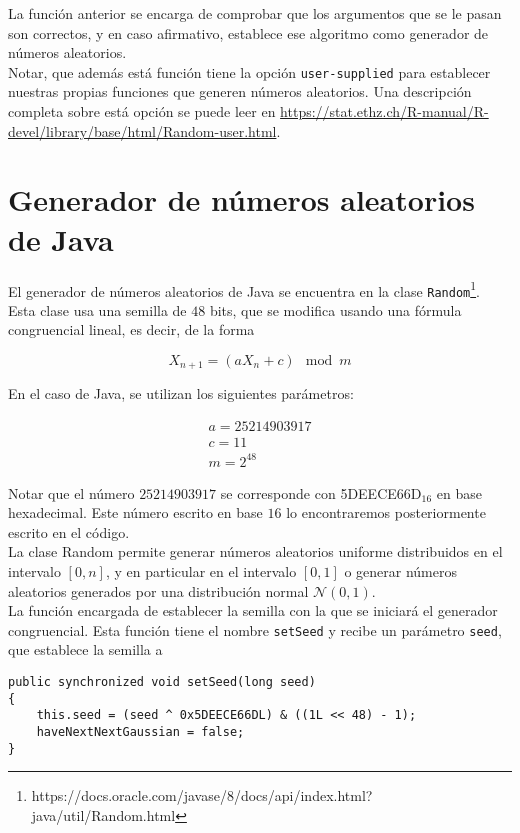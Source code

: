 \documentclass[12pt,a4paper,twoside,openright,titlepage,final]{article}
\begin{document}
La función anterior se encarga de comprobar que los argumentos que se le pasan son correctos, y en caso afirmativo, establece ese algoritmo como generador de números aleatorios.\\

Notar, que además está función tiene la opción \texttt{user-supplied} para establecer nuestras propias funciones que generen números aleatorios. Una descripción completa sobre está opción se puede leer en \url{https://stat.ethz.ch/R-manual/R-devel/library/base/html/Random-user.html}.\\


\section{Generador de números aleatorios de Java}

El generador de números aleatorios de Java se encuentra en la clase \texttt{Random}\footnote{https://docs.oracle.com/javase/8/docs/api/index.html?java/util/Random.html}. Esta clase usa una semilla de $48$ bits, que se modifica usando una fórmula congruencial lineal, es decir, de la forma

\[ X_{n+1} = (a X_n + c) \mod m \]

En el caso de Java, se utilizan los siguientes parámetros:

\[\begin{array}{c}
a = 25214903917\\
c = 11\\
m = 2^{48}
\end{array}\]

Notar que el número $25214903917$ se corresponde con 5DEECE66D$_{16}$ en base hexadecimal. Este número escrito en base $16$ lo encontraremos posteriormente escrito en el código.\\

La clase Random permite generar números aleatorios uniforme distribuidos en el intervalo $[0,n]$, y en particular en el intervalo $[0,1]$ o generar números aleatorios generados por una distribución normal $\mathcal{N}(0,1)$.\\

La función encargada de establecer la semilla con la que se iniciará el generador congruencial. Esta función tiene el nombre \texttt{setSeed} y recibe un parámetro \texttt{seed}, que establece la semilla a

\begin{verbatim}
public synchronized void setSeed(long seed)
{
	this.seed = (seed ^ 0x5DEECE66DL) & ((1L << 48) - 1);
	haveNextNextGaussian = false;
}
\end{verbatim}
\end{document}
